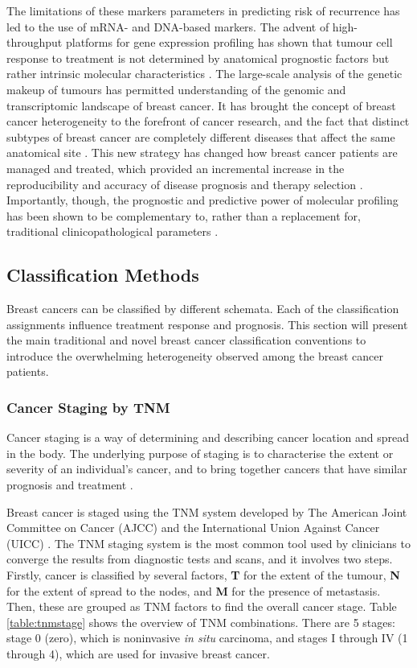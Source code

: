     The limitations of these markers parameters in predicting risk of recurrence has led to the use of mRNA- and DNA-based markers. The advent of high-throughput platforms for gene expression profiling has shown that tumour cell response to treatment is not determined by anatomical prognostic factors but rather intrinsic molecular characteristics \cite{Iwamoto2010PredictingData}. The large-scale analysis of the genetic makeup of tumours has permitted understanding of the genomic and transcriptomic landscape of breast cancer. It has brought the concept of breast cancer heterogeneity to the forefront of cancer research, and the fact that distinct subtypes of breast cancer are completely different diseases that affect the same anatomical site \cite{weigelt2010}. This new strategy has changed how breast cancer patients are managed and treated, which provided an incremental increase in the reproducibility and accuracy of disease prognosis and therapy selection \cite{pusztai2008}. Importantly, though, the prognostic and predictive power of molecular profiling has been shown to be complementary to, rather than a replacement for, traditional clinicopathological parameters \cite{weigelt2010}.

   
    \subsection{Classification Methods} \label{section:classification}
    
    Breast cancers can be classified by different schemata. Each of the classification assignments influence treatment response and prognosis.  This section will present the main traditional and novel breast cancer classification conventions to introduce the overwhelming heterogeneity observed among the breast cancer patients. 


    \subsubsection{Cancer Staging by TNM}
    
    Cancer staging is a way of determining and describing cancer location and spread in the body. The underlying purpose of staging is to characterise the extent or severity of an individual’s cancer, and to bring together cancers that have similar prognosis and treatment \cite{2017AJCCStaging}. 

    Breast cancer is staged using the TNM system developed by The American Joint Committee on Cancer (AJCC) and the International Union Against Cancer (UICC) \cite{Giuliano2017}. The TNM staging system is the most common tool used by clinicians to converge the results from diagnostic tests and scans, and it involves two steps. Firstly, cancer is classified by several factors, \textbf{T} for the extent of the tumour, \textbf{N} for the extent of spread to the nodes, and \textbf{M} for the presence of metastasis. Then, these are grouped as TNM factors to find the overall cancer stage. Table \ref{table:tnmstage} shows the overview of TNM combinations. There are 5 stages: stage 0 (zero), which is noninvasive \textit{in situ} carcinoma, and stages I through IV (1 through 4), which are used for invasive breast cancer.


